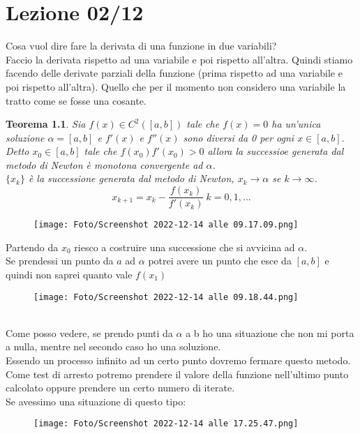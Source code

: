 \documentclass[a4paper, portrait]{book}
\numberwithin{equation}{chapter} %
\newtheorem{theorem}{Teorema}
\begin{document}
\chapter{Lezione 02/12}
Cosa vuol dire fare la derivata di una funzione in due variabili?\\
Faccio la derivata rispetto ad una variabile e poi rispetto all'altra. Quindi stiamo facendo delle derivate parziali della funzione (prima rispetto ad una variabile e poi rispetto all'altra). Quello che per il momento non considero una variabile la tratto come se fosse una cosante.\\
\begin{theorem}
    Sia $f(x) \in C^2([a,b])$ tale che $f(x) = 0$ ha un'unica soluzione $\alpha = [a,b]$ e $f'(x)$ e $f''(x)$ sono diversi da 0 per ogni $x \in [a,b]$. Detto $x_0 \in [a,b]$ tale che $f(x_0)f'(x_0) > 0$ allora la successioe generata dal metodo di Newton è monotona convergente ad $\alpha$.\\
    $\{x_k\}$ è la successione generata dal metodo di Newton, $x_k \rightarrow \alpha$ se $k \rightarrow \infty$.
    \begin{equation}
        x_{k+1} = x_k - \frac{f(x_k)}{f'(x_k)} \ k = 0,1,...
    \end{equation}
\end{theorem}
\begin{figure}[h!]
	\centering
	\texttt{[image: Foto/Screenshot 2022-12-14 alle 09.17.09.png]} 
	\caption{}
\end{figure}
Partendo da $x_0$ riesco a costruire una successione che si avvicina ad $\alpha$.\\
Se prendessi un punto da $a$ ad $\alpha$ potrei avere un punto che esce da $[a,b]$ e quindi non saprei quanto vale $f(x_1)$\\
\begin{figure}[h!]
	\centering
	\texttt{[image: Foto/Screenshot 2022-12-14 alle 09.18.44.png]} 
	\caption{}
\end{figure}
\\Come posso vedere, se prendo punti da $\alpha$ a b ho una situazione che non mi porta a nulla, mentre nel secondo caso ho una soluzione.\\
Essendo un processo infinito ad un certo punto dovremo fermare questo metodo. Come test di arresto potremo prendere il valore della funzione nell'ultimo punto calcolato oppure prendere un certo numero di iterate.\\
Se avessimo una situazione di questo tipo:
\begin{figure}[h!]
    \centering
    \texttt{[image: Foto/Screenshot 2022-12-14 alle 17.25.47.png]}
    \caption{}
\end{figure}
\end{document}
